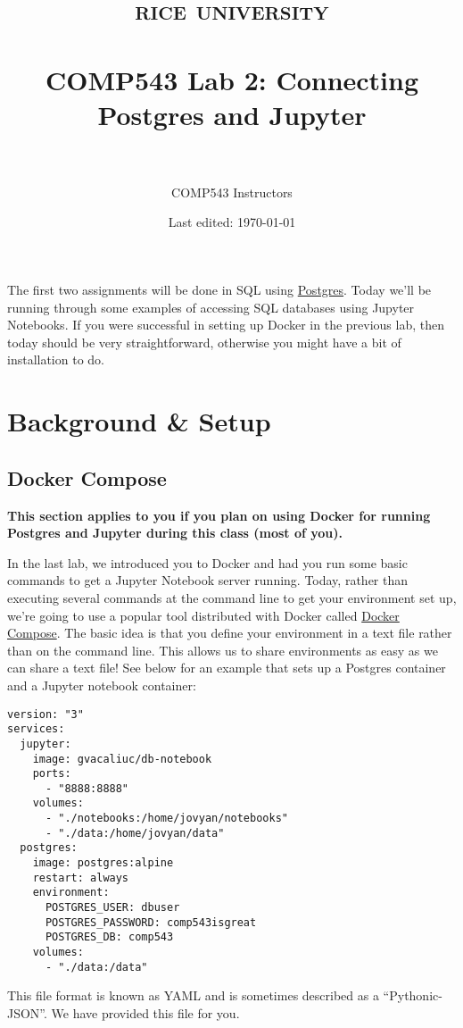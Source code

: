\documentclass[paper=letter, fontsize=12pt]{article}
\title{	
\normalfont \normalsize 
\textsc{rice university} \\ [25pt]
\horrule{0.5pt} \\[0.4cm] 
\huge COMP543 Lab 2: Connecting Postgres and Jupyter \\ 
\horrule{2pt} \\[0.5cm] 
}
\author{COMP543 Instructors}
\date{Last edited: \today}
\numberwithin{equation}{section}
\numberwithin{figure}{section}
\numberwithin{table}{section}
\begin{document}
\maketitle

The first two assignments will be done in SQL using
\href{https://www.postgresql.org/}{Postgres}.  Today we'll be running through
some examples of accessing SQL databases using Jupyter Notebooks.  If you were
successful in setting up Docker in the previous lab, then today should be very
straightforward, otherwise you might have a bit of installation to do.

\section{Background \& Setup}

\subsection{Docker Compose}

\textbf{
  This section applies to you if you plan on using Docker for running Postgres
  and Jupyter during this class (most of you).
}

In the last lab, we introduced you to Docker and had you run some basic
commands to get a Jupyter Notebook server running.  Today, rather than
executing several commands at the command line to get your environment set up,
we're going to use a popular tool distributed with Docker called
\href{https://docs.docker.com/compose/overview/}{Docker Compose}.  The basic
idea is that you define your environment in a text file rather than on the
command line.  This allows us to share environments as easy as we can share a
text file!  See below for an example that sets up a Postgres container and
a Jupyter notebook container:

\begin{verbatim}
version: "3"
services:
  jupyter:
    image: gvacaliuc/db-notebook
    ports:
      - "8888:8888"
    volumes:
      - "./notebooks:/home/jovyan/notebooks" 
      - "./data:/home/jovyan/data"
  postgres:
    image: postgres:alpine
    restart: always
    environment:
      POSTGRES_USER: dbuser
      POSTGRES_PASSWORD: comp543isgreat
      POSTGRES_DB: comp543
    volumes:
      - "./data:/data"
\end{verbatim}

This file format is known as YAML and is sometimes described as a
``Pythonic-JSON''.  We have provided this file for you.
\end{document}
